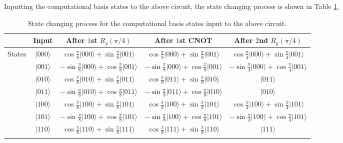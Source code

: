 \documentclass[en]{sol-man}
\begin{document}
\begin{pf}
    Inputting the computational basis states to the above circuit, the state changing process is shown in Table \ref{E4.26-State-Changing-Process},
    \begin{table}[h]
        \centering
        \caption{State changing process for the computational basis states input to the above circuit.}
        \label{E4.26-State-Changing-Process}
        \begin{tabular}{|c|c|c|c|c|}
            \hline
             & Input & After $1$st $R_y(\pi/4)$ & After $1$st CNOT & After $2$nd $R_y(\pi/4)$ \\ \hline
            \multirow{8}{*}{States} & $\lvert 000\rangle$ & $\cos\frac{\pi}{8}\lvert 000\rangle+\sin\frac{\pi}{8}\lvert 001\rangle$ & $\cos\frac{\pi}{8}\lvert 000\rangle+\sin\frac{\pi}{8}\lvert 001\rangle$ & $\cos\frac{\pi}{4}\lvert 000\rangle+\sin\frac{\pi}{4}\lvert 001\rangle$ \\ \cline{2-5} 
             & $\lvert 001\rangle$ & $-\sin\frac{\pi}{8}\lvert 000\rangle+\cos\frac{\pi}{8}\lvert 001\rangle$ & $-\sin\frac{\pi}{8}\lvert 000\rangle+\cos\frac{\pi}{8}\lvert 001\rangle$ & $-\sin\frac{\pi}{4}\lvert 000\rangle+\cos\frac{\pi}{4}\lvert 001\rangle$ \\ \cline{2-5} 
             & $\lvert 010\rangle$ & $\cos\frac{\pi}{8}\lvert 010\rangle+\sin\frac{\pi}{8}\lvert 011\rangle$ & $\cos\frac{\pi}{8}\lvert 011\rangle+\sin\frac{\pi}{8}\lvert 010\rangle$ & $\lvert 011\rangle$ \\ \cline{2-5} 
             & $\lvert 011\rangle$ & $-\sin\frac{\pi}{8}\lvert 010\rangle+\cos\frac{\pi}{8}\lvert 011\rangle$ & $-\sin\frac{\pi}{8}\lvert 011\rangle+\cos\frac{\pi}{8}\lvert 010\rangle$ & $\lvert 010\rangle$ \\ \cline{2-5} 
             & $\lvert 100\rangle$ & $\cos\frac{\pi}{8}\lvert 100\rangle+\sin\frac{\pi}{8}\lvert 101\rangle$ & $\cos\frac{\pi}{8}\lvert 100\rangle+\sin\frac{\pi}{8}\lvert 101\rangle$ & $\cos\frac{\pi}{4}\lvert 100\rangle+\sin\frac{\pi}{4}\lvert 101\rangle$ \\ \cline{2-5} 
             & $\lvert 101\rangle$ & $-\sin\frac{\pi}{8}\lvert 100\rangle+\cos\frac{\pi}{8}\lvert 101\rangle$ & $-\sin\frac{\pi}{8}\lvert 100\rangle+\cos\frac{\pi}{8}\lvert 101\rangle$ & $-\sin\frac{\pi}{4}\lvert 100\rangle+\cos\frac{\pi}{4}\lvert 101\rangle$ \\ \cline{2-5} 
             & $\lvert 110\rangle$ & $\cos\frac{\pi}{8}\lvert 110\rangle+\sin\frac{\pi}{8}\lvert 111\rangle$ & $\cos\frac{\pi}{8}\lvert 111\rangle+\sin\frac{\pi}{8}\lvert 110\rangle$ & $\lvert 111\rangle$ \\ \cline{2-5} 

\end{tabular}
\end{table}
\end{pf}
\end{document}

